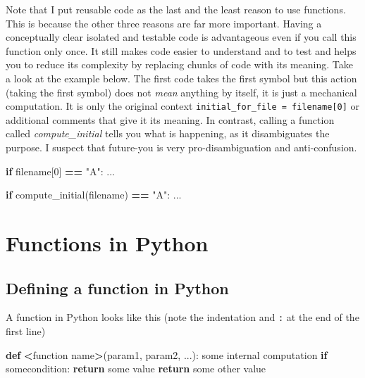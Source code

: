 \documentclass[
]{book}
\newenvironment{Shaded}{\begin{snugshade}}{\end{snugshade}}
\newcommand{\ControlFlowTok}[1]{\textcolor[rgb]{0.13,0.29,0.53}{\textbf{#1}}}
\newcommand{\DecValTok}[1]{\textcolor[rgb]{0.00,0.00,0.81}{#1}}
\newcommand{\KeywordTok}[1]{\textcolor[rgb]{0.13,0.29,0.53}{\textbf{#1}}}
\newcommand{\NormalTok}[1]{#1}
\newcommand{\OperatorTok}[1]{\textcolor[rgb]{0.81,0.36,0.00}{\textbf{#1}}}
\newcommand{\StringTok}[1]{\textcolor[rgb]{0.31,0.60,0.02}{#1}}
\begin{document}
Note that I put reusable code as the last and the least reason to use functions. This is because the other three reasons are far more important. Having a conceptually clear isolated and testable code is advantageous even if you call this function only once. It still makes code easier to understand and to test and helps you to reduce its complexity by replacing chunks of code with its meaning. Take a look at the example below. The first code takes the first symbol but this action (taking the first symbol) does not \emph{mean} anything by itself, it is just a mechanical computation. It is only the original context \texttt{initial\_for\_file\ =\ filename{[}0{]}} or additional comments that give it its meaning. In contrast, calling a function called \emph{compute\_initial} tells you what is happening, as it disambiguates the purpose. I suspect that future-you is very pro-disambiguation and anti-confusion.

\begin{Shaded}
\begin{Highlighting}[]
\ControlFlowTok{if}\NormalTok{ filename[}\DecValTok{0}\NormalTok{] }\OperatorTok{==} \StringTok{"A"}\NormalTok{:}
\NormalTok{    ...}
    
\ControlFlowTok{if}\NormalTok{ compute\_initial(filename) }\OperatorTok{==} \StringTok{"A"}\NormalTok{:}
\NormalTok{    ...}
\end{Highlighting}
\end{Shaded}

\hypertarget{functions-in-python}{%
\section{Functions in Python}\label{functions-in-python}}

\hypertarget{defining-a-function-in-python}{%
\subsection{Defining a function in Python}\label{defining-a-function-in-python}}

A function in Python looks like this (note the indentation and \texttt{:} at the end of the first line)

\begin{Shaded}
\begin{Highlighting}[]
\KeywordTok{def} \OperatorTok{\textless{}}\NormalTok{function name}\OperatorTok{\textgreater{}}\NormalTok{(param1, param2, ...):}
\NormalTok{    some internal computation}
    \ControlFlowTok{if}\NormalTok{ somecondition:}
        \ControlFlowTok{return}\NormalTok{ some value}
    \ControlFlowTok{return}\NormalTok{ some other value}
\end{Highlighting}
\end{Shaded}
\end{document}
